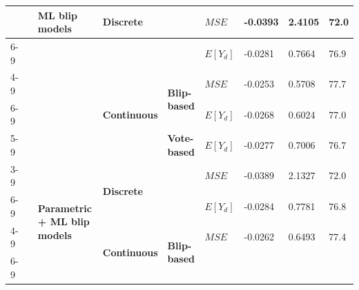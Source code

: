 \documentclass[a4paper,12pt]{article}
\begin{document}
\begin{table}[]
{\begin{tabular}{|l|l|l|l|l|l|l|l|l|}
                                &                                      & \multirow{5}{*}{\textbf{ML blip models}}                     & \multicolumn{2}{l|}{\multirow{2}{*}{\textbf{Discrete}}}                     & \textbf{$MSE$}  & -0.0393              & 2.4105                        & 72.0              \\ \cline{6-9} 
                                &                                      &                                                              & \multicolumn{2}{l|}{}                                                       & \textbf{$E[Y_d]$} & -0.0281              & 0.7664                        & 76.9              \\ \cline{4-9} 
                                &                                      &                                                              & \multirow{3}{*}{\textbf{Continuous}} & \multirow{2}{*}{\textbf{Blip-based}} & \textbf{$MSE$}  & -0.0253              & 0.5708                        & 77.7              \\ \cline{6-9} 
                                &                                      &                                                              &                                      &                                      & \textbf{$E[Y_d]$} & -0.0268              & 0.6024                        & 77.0              \\ \cline{5-9} 
                                &                                      &                                                              &                                      & \textbf{Vote-based}                  & \textbf{$E[Y_d]$} & -0.0277              & 0.7006                        & 76.7              \\ \cline{3-9} 
                                &                                      & \multirow{5}{*}{\textbf{Parametric + ML blip models}}        & \multicolumn{2}{l|}{\multirow{2}{*}{\textbf{Discrete}}}                     & \textbf{$MSE$}  & -0.0389              & 2.1327                        & 72.0              \\ \cline{6-9} 
                                &                                      &                                                              & \multicolumn{2}{l|}{}                                                       & \textbf{$E[Y_d]$} & -0.0284              & 0.7781                        & 76.8              \\ \cline{4-9} 
                                &                                      &                                                              & \multirow{3}{*}{\textbf{Continuous}} & \multirow{2}{*}{\textbf{Blip-based}} & \textbf{$MSE$}  & -0.0262              & 0.6493                        & 77.4              \\ \cline{6-9} 

\end{tabular}}
\end{table}
\end{document}
